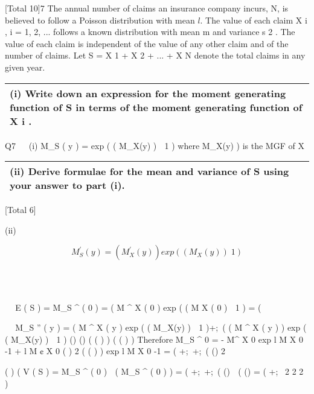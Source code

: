 \documentclass[a4paper,12pt]{article}
\begin{document}
[Total 10]7
The annual number of claims an insurance company incurs, N, is believed to follow
a Poisson distribution with mean $l$. The value of each claim X i , i = 1, 2, ... follows
a known distribution with mean m and variance s 2 . The value of each claim is
independent of the value of any other claim and of the number of claims. Let
S = X 1 + X 2 + ... + X N denote the total claims in any given year.


\newpage

\begin{table}[ht!]
 \centering
 \begin{tabular}{|p{15cm}|}
 \hline  
 (i)
Write down an expression for the moment generating function of S in terms of
the moment generating function of X i .


 \\ \hline
  \end{tabular}
\end{table}


Q7


(i) M_{S} ( y ) = exp ( ( M_X(y) )  1 ) where M_X(y) ) is the MGF of X



\newpage

\begin{table}[ht!]
 \centering
 \begin{tabular}{|p{15cm}|}
 \hline  
 (ii)
Derive formulae for the mean and variance of S using your answer to part (i).

 \\ \hline
  \end{tabular}
\end{table}

[Total 6]

\newpage

(ii) 

\[M_{S} ^{\prime} ( y ) = ( M^{\prime}_X(y)  ) exp ( ( M_X(y) )  1 )\]






 E ( S ) = M_{S} ^{\prime} ( 0 ) = ( M ^{\prime} X ( 0 ) exp ( ( M X ( 0 )  1 ) = (\mu 





M_{S} '' ( y ) = ( M ^{\prime \prime}  X ( y ) exp ( ( M_X(y) )  1 )\;+;\ ( ( M ^{\prime} X ( y ) ) exp ( ( M_X(y) )  1 ) 
()
() { (
( ) ) } (
( ) )
Therefore
 M_{S} ^{\prime \prime}  0 = - M^{\prime \prime}  X 0 exp l M X 0 -1 + l M ¢ X 0
(
)
2
{ ( ( ) ) }
exp l M X 0 -1
= ( \;+;\ \;+;\ ( (\mu  )
2

(
)
(
V ( S ) = M_{S} ^{\prime \prime}  ( 0 )  ( M_{S} ^{\prime} ( 0 ) ) = ( \;+;\ \;+;\ ( (\mu  )  ( (\mu  ) = ( \;+;\ 
2
2
2
)

\end{document}
